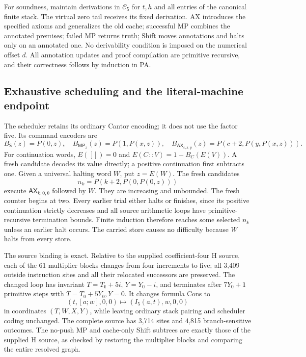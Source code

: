 For soundness, maintain derivations in $\mathcal C_5$ for $t,h$ and all
entries of the canonical finite stack. The virtual zero tail receives
its fixed derivation. AX introduces the specified axioms and generalizes
the old cache; successful MP combines the annotated premises; failed MP
returns truth; Shift moves annotations and halts only on an annotated
one. No derivability condition is imposed on the numerical offset $d$.
All annotation updates and proof compilation are primitive recursive,
and their correctness follows by induction in PA.

\subsection{Exhaustive scheduling and the literal-machine endpoint}

The scheduler retains its ordinary Cantor encoding; it does not use the
factor five. Its command encoders are
\[
 B_{\mathsf S}(z)=P(0,z),\quad
 B_{\mathsf{MP}_x}(z)=P(1,P(x,z)),\quad
 B_{\mathsf{AX}_{c,x,y}}(z)=P(c+2,P(y,P(x,z))).
\]
For continuation words, $E([])=0$ and $E(C::V)=1+B_C(E(V))$.
A fresh candidate decodes its value directly; a positive continuation
first subtracts one. Given a universal halting word $W$, put $z=E(W)$.
The fresh candidates
\[
                    n_k=P(k+2,P(0,P(0,z)))
\]
execute $\mathsf{AX}_{k,0,0}$ followed by $W$. They are increasing and
unbounded. The fresh counter begins at two. Every earlier trial either
halts or finishes, since its positive continuation strictly decreases and
all source arithmetic loops have primitive-recursive termination bounds.
Finite induction therefore reaches some selected $n_k$ unless an earlier
halt occurs. The carried store causes no difficulty because $W$ halts
from every store.

The source binding is exact. Relative to the supplied coefficient-four H
source, each of the 61 multiplier blocks changes from four increments to
five; all 3,409 outside instruction sites and all their relocated successors
are preserved. The changed loop has invariant
$T=T_0+5i$, $Y=Y_0-i$, and terminates after $7Y_0+1$ primitive steps
with $T=T_0+5Y_0,Y=0$. It changes formula Cons to
\[
            (t,[a;w],0,0)\longmapsto(I_5(a,t),w,0,0)
\]
in coordinates $(T,W,X,Y)$, while leaving ordinary stack pairing and
scheduler coding unchanged. The complete source has 3,714 sites and
4,815 branch-sensitive outcomes. The no-push MP and cache-only Shift
subtrees are exactly those of the supplied H source, as checked by restoring
the multiplier blocks and comparing the entire resolved graph.

